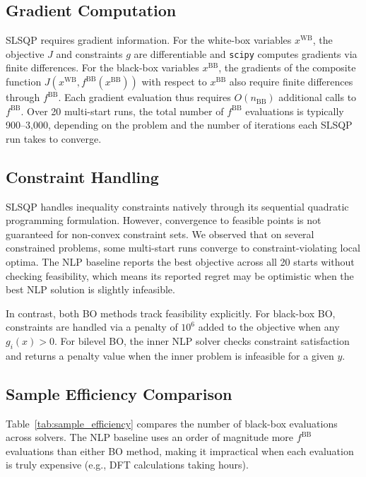 \documentclass[12pt,a4paper]{article}%
\theoremstyle{plain}%
\theoremstyle{remark}%
\theoremstyle{definition}%
\def\WB{\mathrm{WB}}
\def\BB{\mathrm{BB}}
\begin{document}
\begin{appendices}
\subsection{Gradient Computation}\label{subsec:nlp_gradients}

SLSQP requires gradient information. For the white-box variables $x^{\WB}$, the objective $J$ and constraints $g$ are differentiable and \texttt{scipy} computes gradients via finite differences. For the black-box variables $x^{\BB}$, the gradients of the composite function $J(x^{\WB}, f^{\BB}(x^{\BB}))$ with respect to $x^{\BB}$ also require finite differences through $f^{\BB}$. Each gradient evaluation thus requires $O(n_{\BB})$ additional calls to $f^{\BB}$. Over 20 multi-start runs, the total number of $f^{\BB}$ evaluations is typically 900--3{,}000, depending on the problem and the number of iterations each SLSQP run takes to converge.

\subsection{Constraint Handling}\label{subsec:nlp_constraints}

SLSQP handles inequality constraints natively through its sequential quadratic programming formulation. However, convergence to feasible points is not guaranteed for non-convex constraint sets. We observed that on several constrained problems, some multi-start runs converge to constraint-violating local optima. The NLP baseline reports the best objective across all 20 starts without checking feasibility, which means its reported regret may be optimistic when the best NLP solution is slightly infeasible.

In contrast, both BO methods track feasibility explicitly. For black-box BO, constraints are handled via a penalty of $10^6$ added to the objective when any $g_i(x) > 0$. For bilevel BO, the inner NLP solver checks constraint satisfaction and returns a penalty value when the inner problem is infeasible for a given $y$.

\subsection{Sample Efficiency Comparison}\label{subsec:nlp_sample_efficiency}

Table~\ref{tab:sample_efficiency} compares the number of black-box evaluations across solvers. The NLP baseline uses an order of magnitude more $f^{\BB}$ evaluations than either BO method, making it impractical when each evaluation is truly expensive (e.g., DFT calculations taking hours).


\end{appendices}
\end{document}

